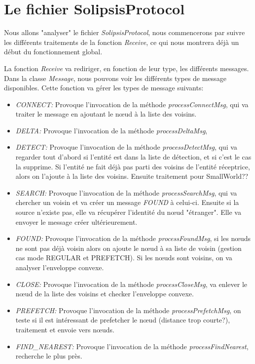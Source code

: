 \documentclass[11pt,a4paper]{article}
\begin{document}
\section{Le fichier SolipsisProtocol}
Nous allons "analyser" le fichier \textit{SolipsisProtocol}, nous commencerons par suivre les différents traitements de la fonction \textit{Receive}, ce qui nous montrera déjà un début du fonctionnement global. 
\par La fonction \textit{Receive} va rediriger, en fonction de leur type, les différents messages. Dans la classe \textit{Message}, nous pouvons voir les différents types de message disponibles. Cette fonction va gérer les types de message suivants:
\begin{itemize}
	\renewcommand{\labelitemi}{$\bullet$}
	\item \textit{CONNECT:} Provoque l'invocation de la méthode \textit{processConnectMsg}, qui va traiter le message en ajoutant le nœud à la liste des voisins. 
	\item \textit{DELTA:} Provoque l'invocation de la méthode \textit{processDeltaMsg}, 
	\item \textit{DETECT:} Provoque l'invocation de la méthode \textit{processDetectMsg}, qui va regarder tout d'abord si l'entité est dans la liste de détection, et si c'est le cas la supprime. Si l'entité ne fait déjà pas parti des voisins de l'entité réceptrice, alors on l'ajoute à la liste des voisins. Ensuite traitement pour SmallWorld??
	\item \textit{SEARCH:} Provoque l'invocation de la méthode \textit{processSearchMsg}, qui va chercher un voisin et va créer un message \textit{FOUND} à celui-ci. Ensuite si la source n'existe pas, elle va récupérer l'identité du nœud "étranger". Elle va envoyer le message créer ultérieurement. 
	\item \textit{FOUND:} Provoque l'invocation de la méthode \textit{processFoundMsg}, si les nœuds ne sont pas déjà voisin alors on ajoute le nœud à sa liste de voisin (gestion cas mode REGULAR et PREFETCH). Si les nœuds sont voisins, on va analyser l'enveloppe convexe.
	\item \textit{CLOSE:} Provoque l'invocation de la méthode \textit{processCloseMsg}, va enlever le nœud de la liste des voisins et checker l'enveloppe convexe.
	\item \textit{PREFETCH:} Provoque l'invocation de la méthode \textit{processPrefetchMsg}, on teste si il est intéressant de prefetcher le nœud (distance trop courte?), traitement et envoie vers nœuds.
	\item \textit{FIND\_NEAREST:} Provoque l'invocation de la méthode \textit{processFindNearest}, recherche le plus près.
\end{itemize}
\end{document}
